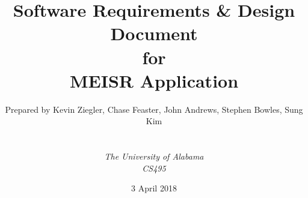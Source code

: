 \def\Institute{\textit{The University of Alabama}}
\def\Course{\textit{CS495}}

\def\BoldTitle{Software Requirements \& Design Document}

\def\Subtitle{for \\ MEISR Application \\}
\def\Authors{Prepared by Kevin Ziegler, Chase Feaster, John Andrews, Stephen Bowles, Sung Kim}


\title{\textbf{\BoldTitle}\\\Subtitle}
\author{\Authors \\ \\ \\ \Institute\\ \Course\\}
\date{3 April 2018}

